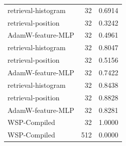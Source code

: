 \begin{tabular}{lrr}
retrieval-histogram & 32 & 0.6914 \\
retrieval-position & 32 & 0.3242 \\
AdamW-feature-MLP & 32 & 0.4961 \\
retrieval-histogram & 32 & 0.8047 \\
retrieval-position & 32 & 0.5156 \\
AdamW-feature-MLP & 32 & 0.7422 \\
retrieval-histogram & 32 & 0.8438 \\
retrieval-position & 32 & 0.8828 \\
AdamW-feature-MLP & 32 & 0.8281 \\
WSP-Compiled & 32 & 1.0000 \\
WSP-Compiled & 512 & 0.0000 \\
\end{tabular}
